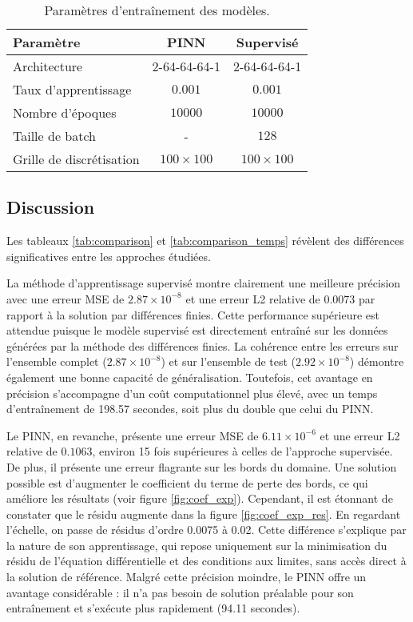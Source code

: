 \documentclass[11pt,a4paper]{article}
\begin{document}
\begin{table}[H]
    \centering
    \begin{tabular}{lcc}
        \toprule
        \textbf{Paramètre} & \textbf{PINN} & \textbf{Supervisé} \\
        \midrule
        Architecture & 2-64-64-64-1 & 2-64-64-64-1 \\
        Taux d'apprentissage & $0.001$ & $0.001$ \\
        Nombre d'époques & $10000$ & $10000$ \\
        Taille de batch & - & $128$ \\
        Grille de discrétisation & $100 \times 100$ & $100 \times 100$ \\
        \bottomrule
    \end{tabular}
    \caption{Paramètres d'entraînement des modèles.}
    \label{tab:parameters}
\end{table}

\subsection{Discussion}

Les tableaux \ref{tab:comparison} et \ref{tab:comparison_temps} révèlent des différences significatives entre les approches étudiées.
\vspace{1em}

La méthode d'apprentissage supervisé montre clairement une meilleure précision avec une erreur MSE de $2.87 \times 10^{-8}$ et une erreur L2 relative de $0.0073$ par rapport à la solution par différences finies. Cette performance supérieure est attendue puisque le modèle supervisé est directement entraîné sur les données générées par la méthode des différences finies. La cohérence entre les erreurs sur l'ensemble complet ($2.87 \times 10^{-8}$) et sur l'ensemble de test ($2.92 \times 10^{-8}$) démontre également une bonne capacité de généralisation. Toutefois, cet avantage en précision s'accompagne d'un coût computationnel plus élevé, avec un temps d'entraînement de 198.57 secondes, soit plus du double que celui du PINN.
\vspace{1em}

Le PINN, en revanche, présente une erreur MSE de $6.11 \times 10^{-6}$ et une erreur L2 relative de $0.1063$, environ 15 fois supérieures à celles de l'approche supervisée. De plus, il présente une erreur flagrante sur les bords du domaine. Une solution possible est d'augmenter le coefficient du terme de perte des bords, ce qui améliore les résultats (voir figure \ref{fig:coef_exp}). Cependant, il est étonnant de constater que le résidu augmente dans la figure \ref{fig:coef_exp_res}. En regardant l'échelle, on passe de résidus d'ordre 0.0075 à 0.02. Cette différence s'explique par la nature de son apprentissage, qui repose uniquement sur la minimisation du résidu de l'équation différentielle et des conditions aux limites, sans accès direct à la solution de référence. Malgré cette précision moindre, le PINN offre un avantage considérable : il n'a pas besoin de solution préalable pour son entraînement et s'exécute plus rapidement (94.11 secondes).
\vspace{1em}
\end{document}
